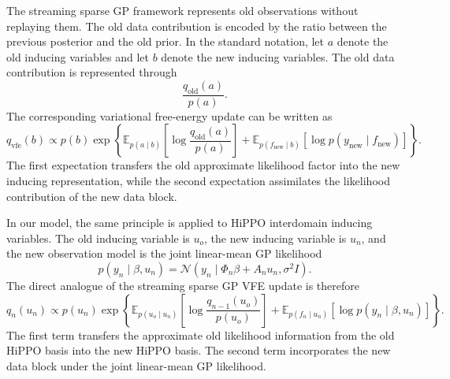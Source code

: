\documentclass[12pt]{article}
\newcommand{\E}{\mathbb{E}}
\begin{document}
The streaming sparse GP framework represents old observations without replaying them.
The old data contribution is encoded by the ratio between the previous posterior and the
old prior. In the standard notation, let \(a\) denote the old inducing variables and let
\(b\) denote the new inducing variables. The old data contribution is represented through
\begin{equation}
    \frac{q_{\mathrm{old}}(a)}{p(a)} .
\end{equation}
The corresponding variational free-energy update can be written as
\begin{equation}
    q_{\mathrm{vfe}}(b)
    \propto
    p(b)
    \exp
    \left\{
    \E_{p(a\mid b)}
    \left[
        \log
        \frac{q_{\mathrm{old}}(a)}{p(a)}
    \right]
    +
    \E_{p(f_{\mathrm{new}}\mid b)}
    \left[
        \log p(y_{\mathrm{new}}\mid f_{\mathrm{new}})
    \right]
    \right\}.
    \label{eq:ssgp_vfe_original}
\end{equation}
The first expectation transfers the old approximate likelihood factor into the new
inducing representation, while the second expectation assimilates the likelihood
contribution of the new data block.

In our model, the same principle is applied to HiPPO interdomain inducing variables.
The old inducing variable is \(u_o\), the new inducing variable is \(u_n\), and the new
observation model is the joint linear-mean GP likelihood
\begin{equation}
    p(y_n\mid \beta,u_n)
    =
    \mathcal{N}
    \left(
        y_n
        \mid
        \Phi_n\beta + A_nu_n,
        \sigma^2 I
    \right).
    \label{eq:joint_likelihood_changing_basis}
\end{equation}
The direct analogue of the streaming sparse GP VFE update is therefore
\begin{equation}
    q_n(u_n)
    \propto
    p(u_n)
    \exp
    \left\{
    \E_{p(u_o\mid u_n)}
    \left[
        \log
        \frac{
            q_{n-1}(u_o)
        }{
            p(u_o)
        }
    \right]
    +
    \E_{p(f_n\mid u_n)}
    \left[
        \log p(y_n\mid \beta,u_n)
    \right]
    \right\}.
    \label{eq:hippo_streaming_vfe_analogue}
\end{equation}
The first term transfers the approximate old likelihood information from the old HiPPO
basis into the new HiPPO basis. The second term incorporates the new data block under
the joint linear-mean GP likelihood.
\end{document}
